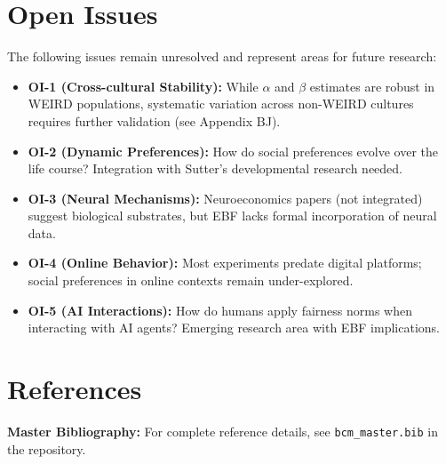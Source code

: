 \section{Open Issues}
\label{sec:feh-open-issues}

The following issues remain unresolved and represent areas for future research:

\begin{itemize}
    \item \textbf{OI-1 (Cross-cultural Stability):} While $\alpha$ and $\beta$
    estimates are robust in WEIRD populations, systematic variation across
    non-WEIRD cultures requires further validation (see Appendix BJ).

    \item \textbf{OI-2 (Dynamic Preferences):} How do social preferences evolve
    over the life course? Integration with Sutter's developmental research needed.

    \item \textbf{OI-3 (Neural Mechanisms):} Neuroeconomics papers (not integrated)
    suggest biological substrates, but EBF lacks formal incorporation of neural data.

    \item \textbf{OI-4 (Online Behavior):} Most experiments predate digital
    platforms; social preferences in online contexts remain under-explored.

    \item \textbf{OI-5 (AI Interactions):} How do humans apply fairness norms
    when interacting with AI agents? Emerging research area with EBF implications.
\end{itemize}


\section{References}
\label{sec:feh-references}

\begin{tcolorbox}[colback=blue!5!white, colframe=blue!75!black]
\textbf{Master Bibliography:} For complete reference details, see
\texttt{bcm\_master.bib} in the repository.
\end{tcolorbox}

